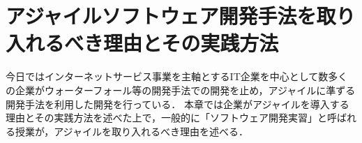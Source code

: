 \chapter{アジャイルソフトウェア開発手法を取り入れるべき理由とその実践方法}

今日ではインターネットサービス事業を主軸とするIT企業を中心として数多くの企業がウォーターフォール等の開発手法での開発を止め，アジャイルに準ずる開発手法を利用した開発を行っている\cite{scrumスクラム}．
本章では企業がアジャイルを導入する理由とその実践方法を述べた上で，一般的に「ソフトウェア開発実習」と呼ばれる授業が，アジャイルを取り入れるべき理由を述べる．



%
